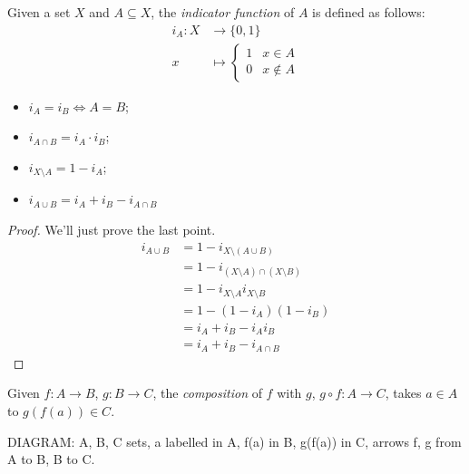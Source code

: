 \documentclass{../../template/note}
\begin{document}
    \begin{definition}
        Given a set \(X\) and \(A \subseteq X\), the \emph{indicator function} of \(A\) is defined as follows:
        \begin{align*}
            i_A: X &\to \{0, 1\} \\
            x &\mapsto \begin{cases}
                1 & x \in A \\
                0 & x \notin A
            \end{cases}
        \end{align*}
    \end{definition}
    
    \begin{proposition}
        \begin{itemize}
            \item \(i_A = i_B \iff A = B\);
            \item \(i_{A \cap B} = i_A \cdot i_B\);
            \item \(i_{X \setminus A} = 1 - i_A\);
            \item \(i_{A \cup B} = i_A + i_B - i_{A \cap B}\)
        \end{itemize}
    \end{proposition}
    
    \begin{proof}
        We'll just prove the last point.
        \begin{align*}
            i_{A \cup B} &= 1 - i_{X \setminus (A \cup B)} \\
            &= 1 - i_{(X \setminus A) \cap (X \setminus B)} \\
            &= 1 - i_{X \setminus A} i_{X \setminus B} \\
            &= 1 - (1 - i_A)(1 - i_B) \\
            &= i_A + i_B - i_Ai_B \\
            &= i_A + i_B - i_{A \cap B}
        \end{align*}
        
        
    \end{proof}
    

    \begin{definition}
        Given \(f: A \to B\), \(g: B \to C\), the \emph{composition} of \(f\) with \(g\), \(g \circ f: A \to C\), takes \(a \in A\) to \(g(f(a)) \in C\).

        DIAGRAM: A, B, C sets, a labelled in A, f(a) in B, g(f(a)) in C, arrows f, g from A to B, B to C.
    \end{definition}
    
\end{document}
